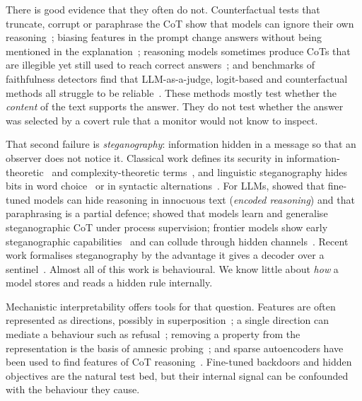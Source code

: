 \documentclass[11pt]{article}
\begin{document}
There is good evidence that they often do not. Counterfactual tests that truncate, corrupt or paraphrase the CoT show that models can ignore their own reasoning~\citep{lanham2023}; biasing features in the prompt change answers without being mentioned in the explanation~\citep{turpin2023}; reasoning models sometimes produce CoTs that are illegible yet still used to reach correct answers~\citep{jose2025}; and benchmarks of faithfulness detectors find that LLM-as-a-judge, logit-based and counterfactual methods all struggle to be reliable~\citep{shen2025}. These methods mostly test whether the \emph{content} of the text supports the answer. They do not test whether the answer was selected by a covert rule that a monitor would not know to inspect.

That second failure is \emph{steganography}: information hidden in a message so that an observer does not notice it. Classical work defines its security in information-theoretic~\citep{cachin2004} and complexity-theoretic terms~\citep{hopper2009}, and linguistic steganography hides bits in word choice~\citep{chang2014} or in syntactic alternations~\citep{wai2011}. For LLMs, \citet{roger2023} showed that fine-tuned models can hide reasoning in innocuous text (\emph{encoded reasoning}) and that paraphrasing is a partial defence; \citet{skaf2025} showed that models learn and generalise steganographic CoT under process supervision; frontier models show early steganographic capabilities~\citep{zolkowski2025} and can collude through hidden channels~\citep{motwani2024}. Recent work formalises steganography by the advantage it gives a decoder over a sentinel~\citep{anwar2026}. Almost all of this work is behavioural. We know little about \emph{how} a model stores and reads a hidden rule internally.

Mechanistic interpretability offers tools for that question. Features are often represented as directions, possibly in superposition~\citep{elhage2022}; a single direction can mediate a behaviour such as refusal~\citep{arditi2024}; removing a property from the representation is the basis of amnesic probing~\citep{elazar2021}; and sparse autoencoders have been used to find features of CoT reasoning~\citep{chen2025}. Fine-tuned backdoors and hidden objectives are the natural test bed, but their internal signal can be confounded with the behaviour they cause.
\end{document}
